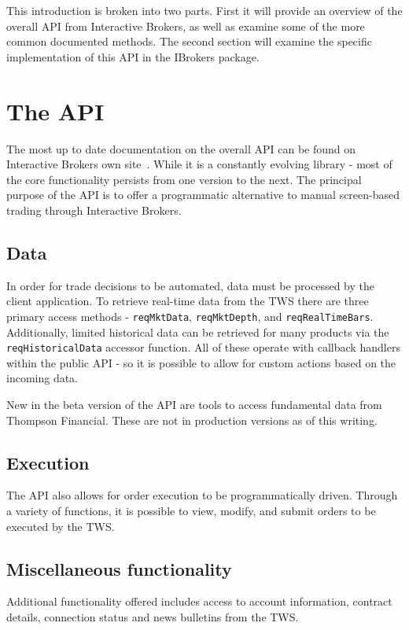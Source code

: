 \documentclass{article}
\begin{document}
This introduction is broken into two parts. First
it will provide an overview of the overall
API from Interactive Brokers, as well as examine some of the
more common documented methods. The second section will
examine the specific implementation of this API in the
IBrokers \cite{IBrokers} package.

\section{The API}
The most up to date documentation on the overall API can be found
on Interactive Brokers own site~\cite{TWSAPI}. While it is a constantly evolving
library - most of the core functionality persists from
one version to the next. The principal purpose of the API is to
offer a programmatic alternative to manual screen-based trading
through Interactive Brokers.

\subsection{Data}
In order for trade decisions to be automated, data
must be processed by the client application. To retrieve
real-time data from the TWS there are three primary
access methods - {\tt reqMktData},
{\tt reqMktDepth}, and {\tt reqRealTimeBars}.  Additionally,
limited historical data can be retrieved for many products
via the {\tt reqHistoricalData} accessor function. All of these
operate with callback handlers within the public API - so
it is possible to allow for custom actions based on the
incoming data.

New in the beta version of the API are tools to access
fundamental data from Thompson Financial.  These are
not in production versions as of this writing.

\subsection{Execution}
The API also allows for order execution to be programmatically
driven. Through a variety of functions, it is possible
to view, modify, and submit orders to be executed by
the TWS.

\subsection{Miscellaneous functionality}
Additional functionality offered includes access
to account information, contract details, connection
status and news bulletins from the TWS.
\end{document}
